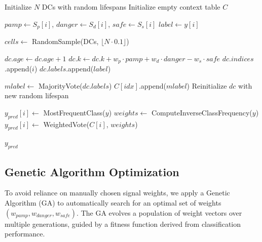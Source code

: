 \documentclass[conference]{IEEEtran}
\begin{document}
\begin{algorithm}
\caption{Dendritic Cell Algorithm}
\label{alg:dca}
\begin{algorithmic}[1]

\State Initialize $N$ DCs with random lifespans
\State Initialize empty context table $C$

 
    \State $pamp \gets S_p[i]$, $danger \gets S_d[i]$, $safe \gets S_s[i]$
    \State $label \gets y[i]$

    \State $cells \gets$ RandomSample(DCs, $\lfloor N \cdot 0.1 \rfloor$)

        \State $dc.age \gets dc.age + 1$
        \State $dc.k \gets dc.k + w_p \cdot pamp + w_d \cdot danger - w_s \cdot safe$
        \State $dc.indices$.append($i$)
        \State $dc.labels$.append($label$)

         
                \State $mlabel \gets$ MajorityVote($dc.labels$)
                    \State $C[idx]$.append($mlabel$)
                \EndFor
            \EndIf
            \State Reinitialize $dc$ with new random lifespan
        \EndIf
    \EndFor
\EndFor

 
        \State $y_{pred}[i] \gets$ MostFrequentClass($y$)
    \Else
        \State $weights \gets$ ComputeInverseClassFrequency($y$)
        \State $y_{pred}[i] \gets$ WeightedVote($C[i]$, $weights$)
    \EndIf
\EndFor

\State \Return $y_{pred}$
\end{algorithmic}
\end{algorithm}

\subsection{Genetic Algorithm Optimization}

To avoid reliance on manually chosen signal weights, we apply a
Genetic Algorithm (GA) to automatically search for an optimal set of
weights $(w_{pamp}, w_{danger}, w_{safe})$. The GA evolves a
population of weight vectors over multiple generations, guided by a
fitness function derived from classification performance.
\end{document}
